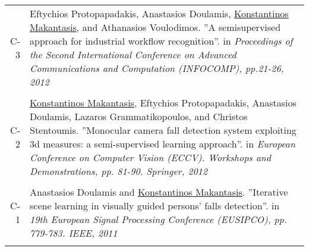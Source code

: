 \documentclass[a4paper,10pt]{article}
\begin{document}
\begin{longtable}{r p{11cm}}
C-3 &\small{Eftychios Protopapadakis, Anastasios Doulamis, \underline{Konstantinos Makantasis}, and Athanasios Voulodimos. ''A semisupervised approach for industrial workflow recognition''. in \textit{Proceedings of the Second International Conference on Advanced Communications and Computation (INFOCOMP), pp.21-26, 2012}}\\
 \multicolumn{2}{c}{} \\
C-2 &\small{\underline{Konstantinos Makantasis}, Eftychios Protopapadakis, Anastasios Doulamis, Lazaros Grammatikopoulos, and Christos Stentoumis. ''Monocular camera fall detection system exploiting 3d measures: a semi-supervised learning approach''. in \textit{European Conference on Computer Vision (ECCV). Workshops and Demonstrations, pp. 81-90. Springer, 2012}}\\
 \multicolumn{2}{c}{} \\
C-1 &\small{Anastasios Doulamis and \underline{Konstantinos Makantasis}. ''Iterative scene learning in visually guided persons' falls detection''. in \textit{19th European Signal Processing Conference (EUSIPCO), pp. 779-783. IEEE, 2011}}\\
 \multicolumn{2}{c}{} \\




\end{longtable}
\end{document}
